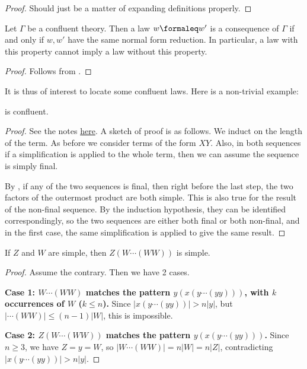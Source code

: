 \begin{proof}
  Should just be a matter of expanding definitions properly.
\end{proof}

\begin{corollary}\label{confluent-anti-impl}
  Let $\Gamma$ be a confluent theory.  Then a law $w \formaleq w'$ is a consequence of $\Gamma$ if and only if $w,w'$ have the same normal form reduction.  In particular, a law with this property cannot imply a law without this property.
\end{corollary}

\begin{proof}
  Follows from .
\end{proof}

It is thus of interest to locate some confluent laws.  Here is a non-trivial example:

\begin{theorem}[477 confluent]\label{477-confl}
   is confluent.
\end{theorem}

\begin{proof}
  See the notes \href{https://www.overleaf.com/project/66f847bb14d0d8f0b77f74e1}{here}.
  A sketch of proof is as follows. We induct on the length of the term.
  As before we consider terms of the form $XY$.
  Also, in both sequences if a simplification is applied to the whole term,
  then we can assume the sequence is simply final.

  By , if any of the two sequences is final,
  then right before the last step, the two factors of the outermost product are both simple.
  This is also true for the result of the non-final sequence. By the induction hypothesis,
  they can be identified correspondingly, so the two sequences are either both final or both
  non-final, and in the first case, the same simplification is applied to give the same result.
\end{proof}

\begin{lemma}[477 lemma]\label{477-lemma}
    If $Z$ and $W$ are simple, then $Z(W\cdots(WW))$ is simple.
\end{lemma}

\begin{proof}
    Assume the contrary. Then we have 2 cases.

    \textbf{Case 1: $W\cdots(WW)$ matches the pattern
    $y(x(y\cdots(yy)))$, with $k$ occurrences of $W$ ($k \le n$).}
    Since $|x(y\cdots(yy))| > n|y|$, but $|\cdots(WW)| \le (n-1)|W|$, this is impossible.

    \textbf{Case 2: $Z(W\cdots(WW))$ matches the pattern
    $y(x(y\cdots(yy)))$.} Since $n \ge 3$, we have $Z = y = W$,
    so $|W\cdots(WW)| = n|W| = n|Z|$,
    contradicting $|x(y\cdots(yy))| > n|y|$.
\end{proof}


